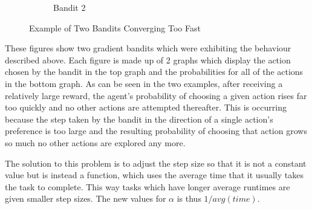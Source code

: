 \begin{figure}[ht]
\begin{subfigure}{.5\textwidth}
  \caption{Bandit 2}
  \label{fig:sub2}
\end{subfigure}
\caption{Example of Two Bandits Converging Too Fast}
\end{figure}

These figures show two gradient bandits which were exhibiting the behaviour described above. Each figure is made up of 2 graphs which display the action chosen by the bandit in the top graph and the probabilities for all of the actions in the bottom graph. As can be seen in the two examples, after receiving a relatively large reward, the agent’s probability of choosing a given action rises far too quickly and no other actions are attempted thereafter. This is occurring because the step taken by the bandit in the direction of a single action’s preference is too large and the resulting probability of choosing that action grows so much no other actions are explored any more. 

The solution to this problem is to adjust the step size so that it is not a constant value but is instead a function, which uses the average time that it usually takes the task to complete. This way tasks which have longer average runtimes are given smaller step sizes. The new values for $\alpha$ is thus $1/avg(time)$.

